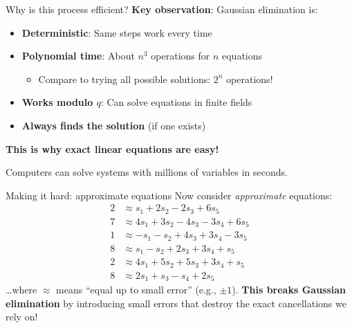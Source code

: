 \documentclass[aspectratio=169, lualatex, handout]{beamer}
\begin{document}
\begin{frame}{Why is this process efficient?}
	\textbf{Key observation}: Gaussian elimination is:
	\begin{itemize}
		\item \textbf{Deterministic}: Same steps work every time
		\item \textbf{Polynomial time}: About $n^3$ operations for $n$ equations
		      \begin{itemize}
			      \item Compare to trying all possible solutions: $2^n$ operations!
		      \end{itemize}
		\item \textbf{Works modulo $q$}: Can solve equations in finite fields
		\item \textbf{Always finds the solution} (if one exists)
	\end{itemize}

	\textbf{This is why exact linear equations are easy!}

	Computers can solve systems with millions of variables in seconds.
\end{frame}

\begin{frame}{Making it hard: approximate equations}
	Now consider \textit{approximate} equations:
	\begin{align*}
		2 & \approx s_1 + 2s_2 - 2s_3 + 6s_5         \\
		7 & \approx 4s_1 + 3s_2 - 4s_3 - 3s_4 + 6s_5 \\
		1 & \approx -s_1 - s_2 + 4s_3 + 3s_4 - 3s_5  \\
		8 & \approx s_1 - s_2 + 2s_3 + 3s_4 + s_5    \\
		2 & \approx 4s_1 + 5s_2 + 5s_3 + 3s_4 + s_5  \\
		8 & \approx 2s_1 + s_3 - s_4 + 2s_5
	\end{align*}
	\ldots where $\approx$ means ``equal up to small error'' (e.g., $\pm 1$). \textbf{This breaks Gaussian elimination} by introducing small errors that destroy the exact cancellations we rely on!
\end{frame}
\end{document}
